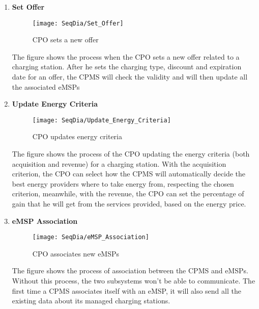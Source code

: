 \begin{enumerate}
        \newpage
        \item \textbf{Set Offer}
        \begin{figure}[H]
            \begin{center}
            \texttt{[image: SeqDia/Set\_Offer]}
            \caption{CPO sets a new offer}
            \label{fig:SetOffer}
            \end{center}
        \end{figure}
        The figure shows the process when the CPO sets a new offer related to a charging station. After he sets the charging type, discount and expiration date for an offer, the CPMS will check the validity and will then update all the associated eMSPs
        \newpage
        \item \textbf{Update Energy Criteria}
        \begin{figure}[H]
            \begin{center}
            \texttt{[image: SeqDia/Update\_Energy\_Criteria]}
            \caption{CPO updates energy criteria}
            \label{fig:UpdateCriteria}
            \end{center}
        \end{figure}
        The figure shows the process of the CPO updating the energy criteria (both acquisition and revenue) for a charging station. With the acquisition criterion, the CPO can select how the CPMS will automatically decide the best energy providers where to take energy from, respecting the chosen criterion, meanwhile, with the revenue, the CPO can set the percentage of gain that he will get from the services provided, based on the energy price.
        \newpage
        \item \textbf{eMSP Association}
        \begin{figure}[H]
            \begin{center}
            \texttt{[image: SeqDia/eMSP\_Association]}
            \caption{CPO associates new eMSPs}
            \label{fig:eMSPAssociation}
            \end{center}
        \end{figure}
        The figure shows the process of association between the CPMS and eMSPs. Without this process, the two subsystems won't be able to communicate. The first time a CPMS associates itself with an eMSP, it will also send all the existing data about its managed charging stations.
\end{enumerate}
